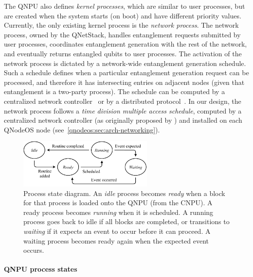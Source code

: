 The \ac{QNPU} also defines \emph{kernel processes}, which are similar to user processes, but are created when the system starts (on boot) and have different priority values. Currently, the only existing kernel process is the \emph{network process}. The network process, owned by the \ac{QNetStack}, handles entanglement requests submitted by user processes, coordinates entanglement generation with the rest of the network, and eventually returns entangled qubits to user processes. The activation of the network process is dictated by a network-wide entanglement generation schedule. Such a schedule defines when a particular entanglement generation request can be processed, and therefore it has intersecting entries on adjacent nodes (given that entanglement is a two-party process). The schedule can be computed by a centralized network controller~\cite{skrzypczyk_2021_arch} or by a distributed protocol~\cite{dahlberg_2019_egp}. In our design, the network process follows a \emph{time division multiple access schedule}, computed by a centralized network controller (as originally proposed by \textcite{skrzypczyk_2021_arch}) and installed on each \ac{QNodeOS} node (see~\cref{qnodeos:sec:arch-networking}).

\begin{figure}
\begin{center}
\includegraphics[width=0.6\textwidth]{figures/qnodeos/supplementary/process-states.pdf}
\end{center}
\caption[]{Process state diagram. An \emph{idle} process becomes \emph{ready} when a block for that process is loaded onto the \ac{QNPU} (from the \ac{CNPU}). A ready process becomes \emph{running} when it is scheduled. A running process goes back to idle if all blocks are completed, or transitions to \emph{waiting} if it expects an event to occur before it can proceed. A waiting process becomes ready again when the expected event occurs.}
\label{qnodeos:fig:process-states}
\end{figure}

\paragraph{QNPU process states}

